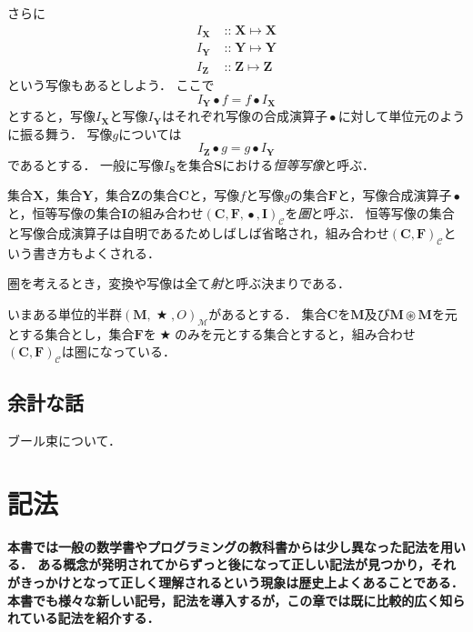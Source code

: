 \documentclass[twocolumn]{jsbook}
\DeclareMathOperator{\mathAnyBinaryOperator}{\bigstar}
\DeclareMathOperator{\mathCompose}{\bullet}
\DeclareMathOperator{\mathIn}{::}
\DeclareMathOperator{\mathMapsTo}{\mapsto}
\DeclareMathOperator{\mathSetTimes}{\circledast}
\newcommand{\mathSet}[1]{\mathbf{#1}}
\newcommand{\mathCategoryShort}[2]{(#1,#2)_\mathcal{C}}
\newcommand{\mathMorph}[2]{#1\mathMapsTo#2}
\newcommand{\mathMonoid}[3]{(#1,#2,#3)_\mathcal{M}}
\newcommand{\mathCategory}[4]{(#1,#2,#3,#4)_\mathcal{C}}
\newcommand{\keyword}[1]{\emph{#1}}
\newenvironment{leader}{\begingroup\bf}{\endgroup}
\begin{document}
さらに
\begin{align*}
I_\mathSet{X}&\mathIn\mathMorph{\mathSet{X}}{\mathSet{X}}\\
I_\mathSet{Y}&\mathIn\mathMorph{\mathSet{Y}}{\mathSet{Y}}\\
I_\mathSet{Z}&\mathIn\mathMorph{\mathSet{Z}}{\mathSet{Z}}
\end{align*}
という写像もあるとしよう．
ここで$$I_\mathSet{Y}\mathCompose f=f\mathCompose I_\mathSet{X}$$とすると，写像$I_\mathSet{X}$と写像$I_\mathSet{Y}$はそれぞれ写像の合成演算子$\mathCompose$に対して単位元のように振る舞う．
写像$g$については$$I_\mathSet{Z}\mathCompose g=g\mathCompose I_\mathSet{Y}$$であるとする．
一般に写像$I_\mathSet{S}$を集合$\mathSet{S}$における\keyword{恒等写像}と呼ぶ．

集合$\mathSet{X}$，集合$\mathSet{Y}$，集合$\mathSet{Z}$の集合$\mathSet{C}$と，写像$f$と写像$g$の集合$\mathSet{F}$と，写像合成演算子$\mathCompose$と，恒等写像の集合$\mathSet{I}$の組み合わせ$\mathCategory{\mathSet{C}}{\mathSet{F}}{\mathCompose}{\mathSet{I}}$を\keyword{圏}と呼ぶ．
恒等写像の集合と写像合成演算子は自明であるためしばしば省略され，組み合わせ$\mathCategoryShort{\mathSet{C}}{\mathSet{F}}$という書き方もよくされる．

圏を考えるとき，変換や写像は全て\keyword{射}と呼ぶ決まりである．

いまある単位的半群$\mathMonoid{\mathSet{M}}{\mathAnyBinaryOperator}{O}$があるとする．
集合$\mathSet{C}$を$\mathSet{M}$及び$\mathSet{M}\mathSetTimes\mathSet{M}$を元とする集合とし，集合$\mathSet{F}$を$\mathAnyBinaryOperator$のみを元とする集合とすると，組み合わせ$\mathCategoryShort{\mathSet{C}}{\mathSet{F}}$は圏になっている．

\section*{余計な話}

ブール束について．

\chapter{記法}

\begin{leader}
本書では一般の数学書やプログラミングの教科書からは少し異なった記法を用いる．
ある概念が発明されてからずっと後になって正しい記法が見つかり，それがきっかけとなって正しく理解されるという現象は歴史上よくあることである．
本書でも様々な新しい記号，記法を導入するが，この章では既に比較的広く知られている記法を紹介する．
\end{leader}
\end{document}
